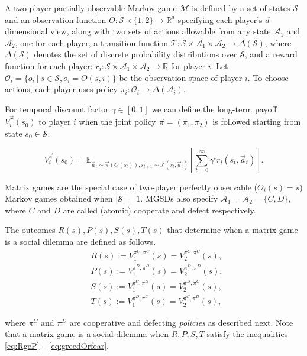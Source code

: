 \documentclass{aamas2017}
\newcommand{\bE}{\mathbb{E}}
\newcommand{\bR}{\mathbb{R}}
\newcommand{\cA}{\mathcal{A}}
\newcommand{\cM}{\mathcal{M}}
\newcommand{\cS}{\mathcal{S}}
\newcommand{\cT}{\mathcal{T}}
\newcommand{\cO}{\mathcal{O}}
\begin{document}
A two-player partially observable Markov game $\cM$ is defined by a set of states $\cS$ and an observation function $O: \cS \times \{1,2\} \rightarrow \bR^d$ specifying each player's $d$-dimensional view, along with two sets of actions allowable from any state $\cA_1$ and $\cA_2$, one for each player, a transition function $\cT: \cS \times \cA_1 \times \cA_2 \rightarrow \Delta(\cS)$, where $\Delta(\cS)$ denotes the set of discrete probability distributions over $\cS$, and a reward function for each player: $r_i: \cS \times \cA_1 \times \cA_2 \rightarrow \bR$ for player $i$.
Let $\cO_i = \{ o_i~|~s \in \cS, o_i = O(s,i)\}$ be the observation space of player $i$.
To choose actions, each player uses policy $\pi_i : \cO_i \rightarrow \Delta(\cA_i)$.

For temporal discount factor $\gamma \in [0, 1]$ we can define the long-term payoff $V^{\vec{\pi}}_i(s_0)$ to player $i$ when the joint policy $\vec{\pi} = (\pi_1, \pi_2)$ is followed starting from state $s_0 \in \cS$. 

\begin{equation}\label{eq:expected_payoff}
V^{\vec{\pi}}_i(s_0) = \bE_{\vec{a}_t \sim \vec{\pi}(O(s_t)), s_{t+1} \sim \cT(s_t, \vec{a}_t)}\left[ \sum_{t = 0}^\infty \gamma^t r_i(s_t, \vec{a}_t) \right].
\end{equation}

Matrix games are the special case of two-player perfectly observable ($O_i(s) = s$) Markov games obtained when $|\cS| = 1$. MGSDs also specify $\cA_1 = \cA_2 = \{C, D\}$, where $C$ and $D$ are called (atomic) cooperate and defect respectively.

The outcomes $R(s), P(s), S(s), T(s)$ that determine when a matrix game is a social dilemma are defined as follows.
\begin{eqnarray}
 &R(s) := V_1^{\pi^C, \pi^C}(s) = V_2^{\pi^C, \pi^C}(s), \label{eq:R}\\
 &P(s) := V_1^{\pi^D, \pi^D}(s) = V_2^{\pi^D, \pi^D}(s), \label{eq:P}\\
 &S(s) := V_1^{\pi^C, \pi^D}(s) = V_2^{\pi^D, \pi^C}(s), \label{eq:S}\\
 &T(s) := V_1^{\pi^D, \pi^C}(s) = V_2^{\pi^C, \pi^D}(s), \label{eq:T}
\end{eqnarray}

where $\pi^C$ and $\pi^D$ are cooperative and defecting {\it policies} as described next.
Note that a matrix game is a social dilemma when $R, P, S, T$ satisfy the inequalities \eqref{eq:RgeP} -- \eqref{eq:greedOrfear}.\\
\end{document}
